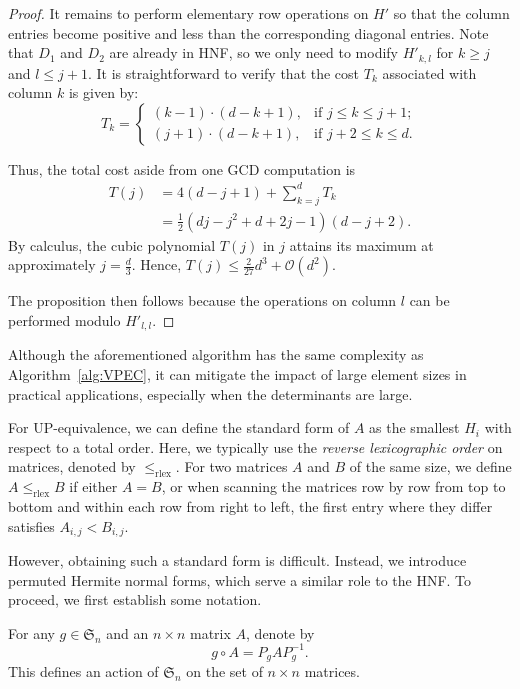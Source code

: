 \documentclass[reqno, 12pt]{article}
\theoremstyle{mydefinition}
\theoremstyle{myremark}
\numberwithin{algorithm}{section}
\begin{document}
\begin{proof}
It remains to perform elementary row operations on $H'$ so that the column entries become positive and less than the corresponding diagonal entries.
Note that $D_1$ and $D_2$ are already in HNF, so we only need to modify $H'_{k,l}$ for $k \geq j$ and $l \leq j+1$.
It is straightforward to verify that the cost $T_k$ associated with column $k$ is given by:
$$
T_k = \begin{cases}
  (k-1) \cdot (d-k+1), & \text{if } j \leq k \leq j+1;\\
  (j+1) \cdot (d-k+1), & \text{if } j+2 \leq k \leq d.
\end{cases}
$$

Thus, the total cost aside from one GCD computation is
\begin{align*}
T(j) &= 4(d-j+1) + \sum_{k=j}^{d} T_k \\
     &= \frac{1}{2} \left(d j - j^{2} + d + 2 j - 1\right) \left(d - j + 2\right).
\end{align*}
By calculus, the cubic polynomial $T(j)$ in $j$ attains its maximum at approximately $j = \frac{d}{3}$.
Hence, $T(j) \leq \frac{2}{27}d^3 + \mathcal{O}(d^2)$.

The proposition then follows because the operations on column $l$ can be performed modulo $H'_{l,l}$.
\end{proof}


Although the aforementioned algorithm has the same complexity as Algorithm~\ref{alg:VPEC}, it can mitigate the impact of large element sizes in practical applications, especially when the determinants are large.

For UP-equivalence, we can define the standard form of $A$ as the smallest $H_i$ with respect to a total order. Here, we typically use the \emph{reverse lexicographic order} on matrices, denoted by $\le_{\text{rlex}}$. For two matrices $A$ and $B$ of the same size, we define $A \le_{\text{rlex}} B$ if either $A = B$, or when scanning the matrices row by row from top to bottom and within each row from right to left, the first entry where they differ satisfies $A_{i,j} < B_{i,j}$.

However, obtaining such a standard form is difficult. Instead, we introduce permuted Hermite normal forms, which serve a similar role to the HNF. To proceed, we first establish some notation.


For any $g \in \mathfrak{S}_n$ and an $n \times n$ matrix $A$, denote by
$$
g \circ A = P_g A P_g^{-1}.
$$
This defines an action of $\mathfrak{S}_n$ on the set of $n \times n$ matrices.
\end{document}
